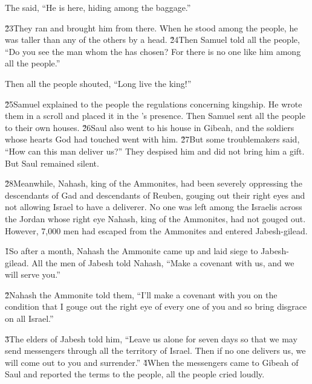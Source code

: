 The  said, ``He is here, hiding among the baggage.''

\v{23}They ran and brought him from there. When he stood among the people, he was taller than any of the others by a head. \v{24}Then Samuel told all the people, ``Do you see the man whom the  has chosen? For there is no one like him among all the people.''

Then all the people shouted, ``Long live the king!''

\v{25}Samuel explained to the people the regulations concerning kingship. He wrote them in a scroll and placed it in the 's presence. Then Samuel sent all the people to their own houses. \v{26}Saul also went to his house in Gibeah, and the soldiers whose hearts God had touched went with him. \v{27}But some troublemakers said, ``How can this man deliver us?'' They despised him and did not bring him a gift. But Saul remained silent.

\v{28}Meanwhile, Nahash, king of the Ammonites, had been severely oppressing the descendants of Gad and descendants of Reuben, gouging out their right eyes and not allowing Israel to have a deliverer. No one was left among the Israelis across the Jordan whose right eye Nahash, king of the Ammonites, had not gouged out. However, 7,000 men had escaped from the Ammonites and entered Jabesh-gilead.

\v{1}So after a month, Nahash the Ammonite came up and laid siege to Jabesh-gilead. All the men of Jabesh told Nahash, ``Make a covenant with us, and we will serve you.''

\v{2}Nahash the Ammonite told them, ``I'll make a covenant with you on the condition that I gouge out the right eye of every one of you and so bring disgrace on all Israel.''

\v{3}The elders of Jabesh told him, ``Leave us alone for seven days so that we may send messengers through all the territory of Israel. Then if no one delivers us, we will come out to you and surrender.'' \v{4}When the messengers came to Gibeah of Saul and reported the terms to the people, all the people cried loudly.

